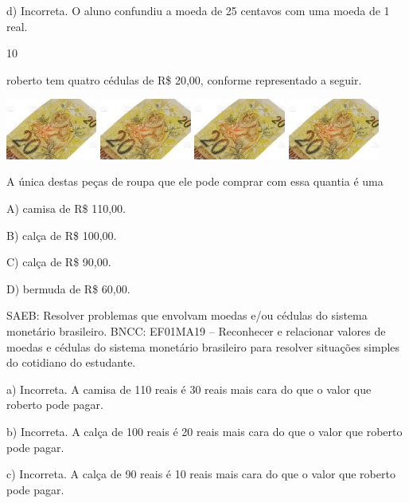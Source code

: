 \begin{itemize}
\begin{itemize}
d) Incorreta. O aluno confundiu a moeda de 25 centavos com uma moeda de
1 real.

\num{10}

roberto tem quatro cédulas de R\$ 20,00, conforme representado a seguir.

\includegraphics[width=1.18253in,height=0.78643in]{media/image108.jpg}
\includegraphics[width=1.18253in,height=0.78643in]{media/image108.jpg}
\includegraphics[width=1.18253in,height=0.78643in]{media/image108.jpg}
\includegraphics[width=1.18253in,height=0.78643in]{media/image108.jpg}

A única destas peças de roupa que ele pode comprar com essa quantia é uma

A) camisa de R\$ 110,00.

B) calça de R\$ 100,00.

C) calça de R\$ 90,00.

D) bermuda de R\$ 60,00.

SAEB: Resolver problemas que envolvam moedas e/ou cédulas do
sistema monetário brasileiro.
BNCC: EF01MA19 -- Reconhecer e relacionar valores de moedas e cédulas do
sistema monetário brasileiro para resolver situações simples do
cotidiano do estudante.

a) Incorreta. A camisa de 110 reais é 30 reais mais cara do que o valor que
roberto pode pagar.

b) Incorreta. A calça de 100 reais é 20 reais mais cara do que o valor que
roberto pode pagar.

c) Incorreta. A calça de 90 reais é 10 reais mais cara do que o valor que
roberto pode pagar.


\end{itemize}
\end{itemize}
